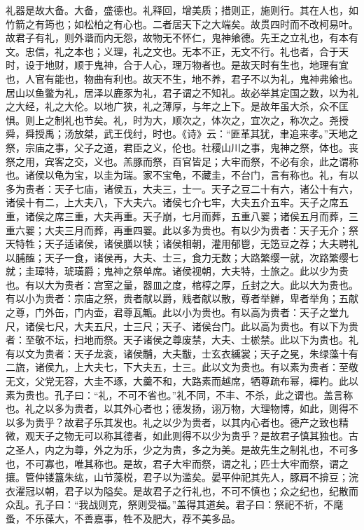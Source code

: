 \documentclass[]{article}
\begin{document}
礼器是故大备。大备，盛德也。礼释回，增美质；措则正，施则行。其在人也，如竹箭之有筠也；如松柏之有心也。二者居天下之大端矣。故贯四时而不改柯易叶。故君子有礼，则外谐而内无怨，故物无不怀仁，鬼神飨德。先王之立礼也，有本有文。忠信，礼之本也；义理，礼之文也。无本不正，无文不行。礼也者，合于天时，设于地财，顺于鬼神，合于人心，理万物者也。是故天时有生也，地理有宜也，人官有能也，物曲有利也。故天不生，地不养，君子不以为礼，鬼神弗飨也。居山以鱼鳖为礼，居泽以鹿豕为礼，君子谓之不知礼。故必举其定国之数，以为礼之大经，礼之大伦。以地广狭，礼之薄厚，与年之上下。是故年虽大杀，众不匡惧。则上之制礼也节矣。礼，时为大，顺次之，体次之，宜次之，称次之。尧授舜，舜授禹；汤放桀，武王伐纣，时也。《诗》云：``匪革其犹，聿追来孝。''天地之祭，宗庙之事，父子之道，君臣之义，伦也。社稷山川之事，鬼神之祭，体也。丧祭之用，宾客之交，义也。羔豚而祭，百官皆足；大牢而祭，不必有余，此之谓称也。诸侯以龟为宝，以圭为瑞。家不宝龟，不藏圭，不台门，言有称也。礼，有以多为贵者：天子七庙，诸侯五，大夫三，士一。天子之豆二十有六，诸公十有六，诸侯十有二，上大夫八，下大夫六。诸侯七介七牢，大夫五介五牢。天子之席五重，诸侯之席三重，大夫再重。天子崩，七月而葬，五重八翣；诸侯五月而葬，三重六翣；大夫三月而葬，再重四翣。此以多为贵也。有以少为贵者：天子无介；祭天特牲；天子适诸侯，诸侯膳以犊；诸侯相朝，灌用郁鬯，无笾豆之荐；大夫聘礼以脯醢；天子一食，诸侯再，大夫、士三，食力无数；大路繁缨一就，次路繁缨七就；圭璋特，琥璜爵；鬼神之祭单席。诸侯视朝，大夫特，士旅之。此以少为贵也。有以大为贵者：宫室之量，器皿之度，棺椁之厚，丘封之大。此以大为贵也。有以小为贵者：宗庙之祭，贵者献以爵，贱者献以散，尊者举觯，卑者举角；五献之尊，门外缶，门内壶，君尊瓦甒。此以小为贵也。有以高为贵者：天子之堂九尺，诸侯七尺，大夫五尺，士三尺；天子、诸侯台门。此以高为贵也。有以下为贵者：至敬不坛，扫地而祭。天子诸侯之尊废禁，大夫、士棜禁。此以下为贵也。礼有以文为贵者：天子龙衮，诸侯黼，大夫黻，士玄衣纁裳；天子之冕，朱绿藻十有二旒，诸侯九，上大夫七，下大夫五，士三。此以文为贵也。有以素为贵者：至敬无文，父党无容，大圭不琢，大羹不和，大路素而越席，牺尊疏布幂，樿杓。此以素为贵也。孔子曰：``礼，不可不省也。''礼不同，不丰、不杀，此之谓也。盖言称也。礼之以多为贵者，以其外心者也；德发扬，诩万物，大理物博，如此，则得不以多为贵乎？故君子乐其发也。礼之以少为贵者，以其内心者也。德产之致也精微，观天子之物无可以称其德者，如此则得不以少为贵乎？是故君子慎其独也。古之圣人，内之为尊，外之为乐，少之为贵，多之为美。是故先生之制礼也，不可多也，不可寡也，唯其称也。是故，君子大牢而祭，谓之礼；匹士大牢而祭，谓之攘。管仲镂簋朱纮，山节藻棁，君子以为滥矣。晏平仲祀其先人，豚肩不揜豆；浣衣濯冠以朝，君子以为隘矣。是故君子之行礼也，不可不慎也；众之纪也，纪散而众乱。孔子曰：``我战则克，祭则受福。''盖得其道矣。君子曰：祭祀不祈，不麾蚤，不乐葆大，不善嘉事，牲不及肥大，荐不美多品。
\end{document}
